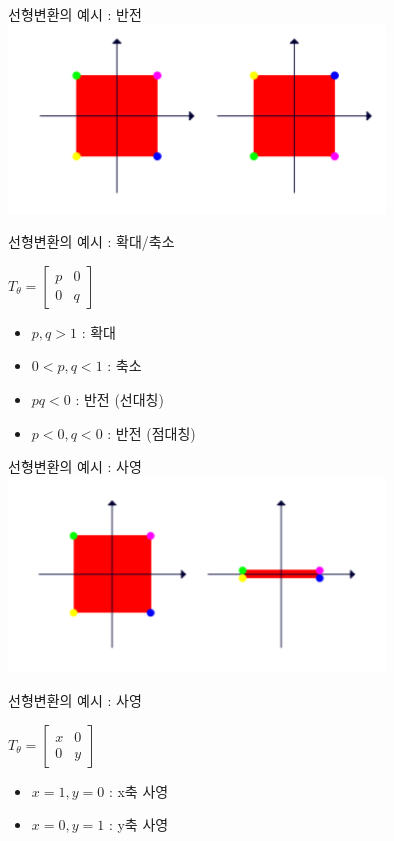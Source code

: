 \documentclass{beamer}
\begin{document}
\begin{frame}{선형변환의 예시 : 반전}
\includegraphics[width=10cm,keepaspectratio]{reflect1}
\end{frame}


\begin{frame}{선형변환의 예시 : 확대/축소}

$T_{\theta} = 
\left[ \begin{matrix}
p & 0  \\
0 & q
\end{matrix} \right] $

\begin{itemize} 
\item $p,q>1$ : 확대 
\item $0<p,q<1$ : 축소 
\item $pq<0$ : 반전 (선대칭)
\item $p<0, q<0$ : 반전 (점대칭)
\end{itemize}
\end{frame}


\begin{frame}{선형변환의 예시 : 사영} 
\includegraphics[width=10cm,keepaspectratio]{project1}
\end{frame}

\begin{frame}{선형변환의 예시 : 사영}

$T_{\theta} = 
\left[ \begin{matrix}
x & 0 \\
0 & y
\end{matrix} \right] $


\begin{itemize} 
\item $x=1, y=0$ : x축 사영 
\item $x=0, y=1$ : y축 사영 
\end{itemize}
\end{frame}
\end{document}
